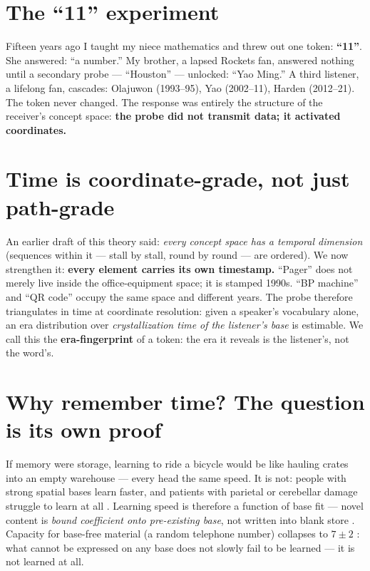 \documentclass[12pt, a4paper]{article}
\begin{document}
\section{The ``11'' experiment}
Fifteen years ago I taught my niece mathematics and threw out one token: \textbf{``11''}. She answered: ``a number.'' My brother, a lapsed Rockets fan, answered nothing until a secondary probe --- ``Houston'' --- unlocked: ``Yao Ming.'' A third listener, a lifelong fan, cascades: Olajuwon (1993--95), Yao (2002--11), Harden (2012--21). The token never changed. The response was entirely the structure of the receiver's concept space: \textbf{the probe did not transmit data; it activated coordinates.}

\section{Time is coordinate-grade, not just path-grade}
An earlier draft of this theory said: \emph{every concept space has a temporal dimension} (sequences within it --- stall by stall, round by round --- are ordered). We now strengthen it: \textbf{every element carries its own timestamp.} ``Pager'' does not merely live inside the office-equipment space; it is stamped 1990s. ``BP machine'' and ``QR code'' occupy the same space and different years. The probe therefore triangulates in time at coordinate resolution: given a speaker's vocabulary alone, an era distribution over \emph{crystallization time of the listener's base} is estimable. We call this the \textbf{era-fingerprint} of a token: the era it reveals is the listener's, not the word's.

\section{Why remember time? The question is its own proof}
If memory were storage, learning to ride a bicycle would be like hauling crates into an empty warehouse --- every head the same speed. It is not: people with strong spatial bases learn faster, and patients with parietal or cerebellar damage struggle to learn at all \cite{schmidt1975}. Learning speed is therefore a function of base fit --- novel content is \emph{bound coefficient onto pre-existing base}, not written into blank store \cite{bransford1972,rosch1975,chase1973,cls1995}. Capacity for base-free material (a random telephone number) collapses to $7\pm2$ \cite{miller1956}: what cannot be expressed on any base does not slowly fail to be learned --- it is not learned at all.
\end{document}
